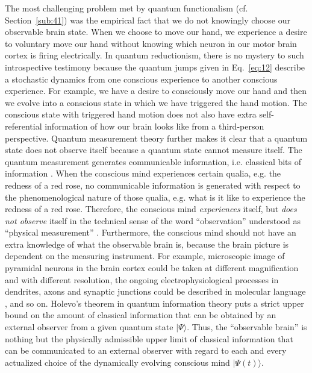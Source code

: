 \documentclass{ws-ijmpb}
\begin{document}
The most challenging problem met by quantum functionalism (cf. Section~\ref{sub:41}) was the
empirical fact that we do not knowingly choose our observable brain
state. When we choose to move our hand, we experience a desire to
voluntary move our hand without knowing which neuron in our motor
brain cortex is firing electrically. In quantum reductionism, there
is no mystery to such introspective testimony because the quantum
jumps given in Eq.~\eqref{eq:12} describe a stochastic dynamics from
one conscious experience to another conscious experience.
For example, we have a desire to consciously move our hand and then we evolve into a conscious
state in which we have triggered the hand motion. The conscious state
with triggered hand motion does not also have extra self-referential information
of how our brain looks like from a third-person perspective.
Quantum measurement theory \cite{Braginsky1992,Busch1996} further makes it clear that a quantum state does not observe itself because a quantum state cannot measure itself.
The quantum measurement generates communicable information, i.e. classical bits of information \cite{Georgiev2017}.
When the conscious mind experiences certain qualia, e.g. the redness of a red rose,
no communicable information is generated with respect to the phenomenological nature of those qualia, e.g. what is it like to experience the redness of a red rose.
Therefore, the conscious mind \emph{experiences} itself, but \emph{does not observe} itself in the technical sense of the word ``observation'' understood as ``physical measurement'' \cite{Georgiev2020a,Georgiev2020b}.
Furthermore, the conscious mind should not have an extra knowledge of what the
observable brain is, because the brain picture is dependent on the measuring instrument.
For example, microscopic image of pyramidal neurons in the brain cortex
could be taken at different magnification and with different resolution,
the ongoing electrophysiological processes in dendrites, axons and synaptic junctions could be described in molecular
language \cite{Johnston1995,Melkikh2019}, and so on.
Holevo's theorem in quantum information theory puts a strict upper bound on
the amount of classical information that can be obtained by an external
observer from a given quantum state $\vert \Psi\rangle$. Thus, the ``observable
brain'' is nothing but the physically admissible upper limit
of classical information that can be communicated to an external observer
with regard to each and every actualized choice of the dynamically
evolving conscious mind $\vert \Psi(t)\rangle$.
\end{document}
